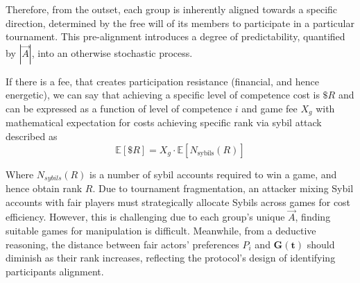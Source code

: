 \documentclass{article}
\begin{document}
\begin{CJK}{UTF8}{gbsn}
\begin{multicols}{2}
        Therefore, from the outset, each group is inherently aligned towards a specific direction, determined by the free will of its members to participate in a particular tournament. This pre-alignment introduces a degree of predictability, quantified by $|\vec{A}|$, into an otherwise stochastic process.


        If there is a fee, that creates participation resistance (financial, and hence energetic), we can say that achieving a specific level of competence cost is $\$R$ and can be expressed as a function of level of competence $i$ and game fee $X_g$ with mathematical expectation for costs achieving specific rank via sybil attack described as
            \begin{equation}
                \mathbb{E}[\$R] = X_g \cdot \mathbb{E}[N_{\text{sybils}}(R)]
            \end{equation}


            Where $N_{sybils}(R)$ is a number of sybil accounts required to win a game, and hence obtain rank $R$. Due to tournament fragmentation, an attacker mixing Sybil accounts with fair players must strategically allocate Sybils across games for cost efficiency. However, this is challenging due to each group's unique $\vec{A}$, finding suitable games for manipulation is difficult.  Meanwhile, from a deductive reasoning, the distance between fair actors' preferences $P_i$ and $\mathbf{G(t)}$ should diminish as their rank increases, reflecting the protocol's design of identifying participants alignment.



\end{multicols}
\end{CJK}
\end{document}
